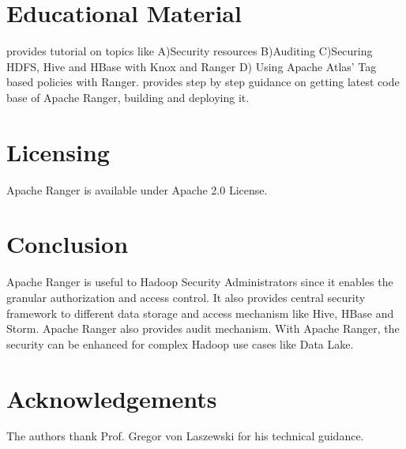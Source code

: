 \documentclass[9pt,twocolumn,twoside]{../../styles/osajnl}
\begin{document}
\section{Educational Material}
\cite{www-ranger-tutorial} provides tutorial on topics like A)Security
resources B)Auditing C)Securing HDFS, Hive and HBase with Knox and Ranger D)
Using Apache Atlas' Tag based policies with Ranger.
\cite{www-ranger-quickstart} provides step by step guidance on getting latest
code base of Apache Ranger, building and deploying it.

\section{Licensing}
Apache Ranger is available under Apache 2.0 License.

\section{Conclusion}
Apache Ranger is useful to Hadoop Security Administrators since it enables
the granular authorization and access control. It also provides central
security framework to different data storage and access mechanism like Hive,
HBase and Storm. Apache Ranger also provides audit mechanism. With Apache
Ranger, the security can be enhanced for complex Hadoop use cases like Data
Lake.

\section*{Acknowledgements}

The authors thank Prof. Gregor von Laszewski for his technical guidance.



\end{document}
